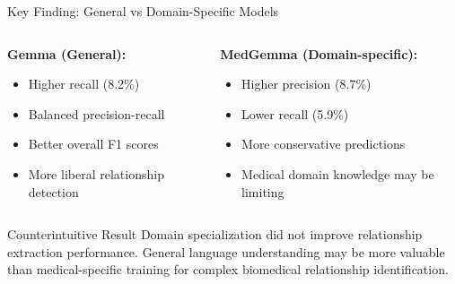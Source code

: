 \documentclass[aspectratio=169, 11pt]{beamer}
\begin{document}
\begin{frame}{Key Finding: General vs Domain-Specific Models}
    \vspace{0.4cm}
    \begin{columns}[T]
        \begin{column}{0.5\textwidth}
            \textbf{Gemma (General):}
            \begin{itemize}
                \setlength{\itemsep}{0.3cm}
                \item Higher recall (8.2\%)
                \item Balanced precision-recall
                \item Better overall F1 scores
                \item More liberal relationship detection
            \end{itemize}
        \end{column}
        \begin{column}{0.5\textwidth}
            \textbf{MedGemma (Domain-specific):}
            \begin{itemize}
                \setlength{\itemsep}{0.3cm}
                \item Higher precision (8.7\%)
                \item Lower recall (5.9\%)
                \item More conservative predictions
                \item Medical domain knowledge may be limiting
            \end{itemize}
        \end{column}
    \end{columns}
    
    \vspace{0.6cm}
    \begin{alertblock}{Counterintuitive Result}
        Domain specialization did not improve relationship extraction performance. General language understanding may be more valuable than medical-specific training for complex biomedical relationship identification.
    \end{alertblock}
\end{frame}
\end{document}
